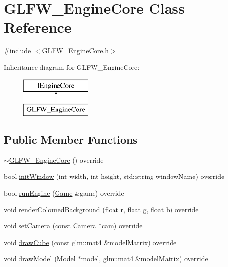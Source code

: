 \hypertarget{class_g_l_f_w___engine_core}{}\section{G\+L\+F\+W\+\_\+\+Engine\+Core Class Reference}
\label{class_g_l_f_w___engine_core}


{\ttfamily \#include $<$G\+L\+F\+W\+\_\+\+Engine\+Core.\+h$>$}

Inheritance diagram for G\+L\+F\+W\+\_\+\+Engine\+Core\+:\begin{figure}[H]
\begin{center}
\leavevmode
\includegraphics[height=2.000000cm]{class_g_l_f_w___engine_core}
\end{center}
\end{figure}
\subsection*{Public Member Functions}
\begin{DoxyCompactItemize}
\item 
\mbox{\hyperlink{class_g_l_f_w___engine_core_adf17916892982f1103140b22dc1b37be}{$\sim$\+G\+L\+F\+W\+\_\+\+Engine\+Core}} () override
\item 
bool \mbox{\hyperlink{class_g_l_f_w___engine_core_aa786131ec64e7ee6779c3ac1ee8507ce}{init\+Window}} (int width, int height, std\+::string window\+Name) override
\item 
bool \mbox{\hyperlink{class_g_l_f_w___engine_core_adf9266f1a9b5d97992691224f0f20c7b}{run\+Engine}} (\mbox{\hyperlink{class_game}{Game}} \&game) override
\item 
void \mbox{\hyperlink{class_g_l_f_w___engine_core_a6031a54b0978d6e0fd1be3f292c2059f}{render\+Coloured\+Background}} (float r, float g, float b) override
\item 
void \mbox{\hyperlink{class_g_l_f_w___engine_core_a2aba4fb8a635f96fc4057ba841670a29}{set\+Camera}} (const \mbox{\hyperlink{class_camera}{Camera}} $\ast$cam) override
\item 
void \mbox{\hyperlink{class_g_l_f_w___engine_core_a728d1f6ffd1e8526611ab0856db537c0}{draw\+Cube}} (const glm\+::mat4 \&model\+Matrix) override
\item 
void \mbox{\hyperlink{class_g_l_f_w___engine_core_a51f39fe1ceea2f8c47d7c8e89118139d}{draw\+Model}} (\mbox{\hyperlink{class_model}{Model}} $\ast$model, glm\+::mat4 \&model\+Matrix) override
\end{DoxyCompactItemize}


